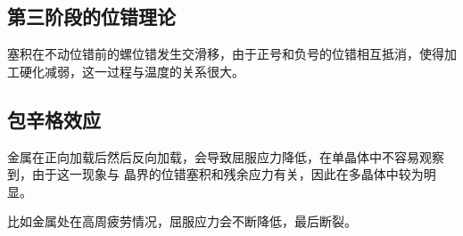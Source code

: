     \subsection{第三阶段的位错理论}
        塞积在不动位错前的螺位错发生交滑移，由于正号和负号的位错相互抵消，使得加工硬化减弱，这一过程与温度的关系很大。
    \subsection{包辛格效应}
        金属在正向加载后然后反向加载，会导致屈服应力降低，在单晶体中不容易观察到，由于这一现象与
        晶界的位错塞积和残余应力有关，因此在多晶体中较为明显。

        比如金属处在高周疲劳情况，屈服应力会不断降低，最后断裂。